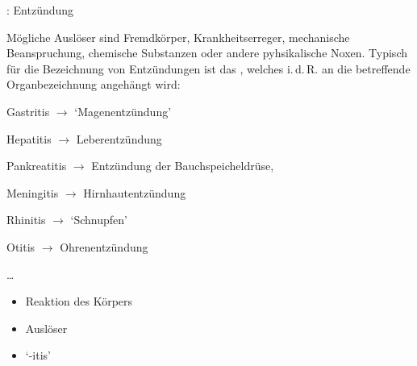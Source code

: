 {{\TxBeschreibung}: Entzündung}
{%
%
\label{topic:entzuendung}%
Mögliche Auslöser sind Fremdkörper, Krankheitserreger,
mechanische Beanspruchung, chemische Substanzen oder andere
pyhsikalische Noxen.
Typisch für die Bezeichnung von Entzündungen ist das
,
welches i.\,d.\,R. an die betreffende Organbezeichnung angehängt
wird: 
\begin{compactitem}
  \item Gastritis ${\rightarrow}$ \enquote*{Magenentzündung}
  \item Hepatitis ${\rightarrow}$ Leberentzündung
  \item Pankreatitis ${\rightarrow}$ Entzündung der Bauchspeicheldrüse,
  \item Meningitis ${\rightarrow}$ Hirnhautentzündung
  \item Rhinitis ${\rightarrow}$ \enquote*{Schnupfen}
  \item Otitis ${\rightarrow}$ Ohrenentzündung
  \item \ldots
\end{compactitem}
}
{
\begin{itemize}
  \item Reaktion des Körpers
  \item Auslöser
  \item {\enquote*{{-itis}}}
\end{itemize}


}
{}
{}
{}


